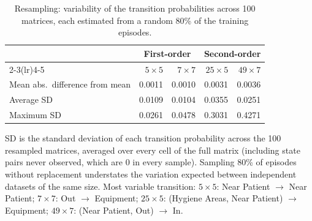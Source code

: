 \begin{table}[htbp]
\centering
\small
\caption{Resampling: variability of the transition probabilities across 100 matrices, each estimated from a random 80\% of the training episodes.}
\label{tab:bootstrap}
\setlength{\tabcolsep}{4pt}
\begin{tabular*}{\linewidth}{@{\extracolsep{\fill}}lrrrr}
\toprule
 & \multicolumn{2}{c}{\textbf{First-order}} & \multicolumn{2}{c}{\textbf{Second-order}} \\
\cmidrule(lr){2-3}\cmidrule(lr){4-5}
 & $5\times5$ & $7\times7$ & $25\times5$ & $49\times7$ \\
\midrule
Mean abs.\ difference from mean & 0.0011 & 0.0010 & 0.0031 & 0.0036 \\
Average SD & 0.0109 & 0.0104 & 0.0355 & 0.0251 \\
Maximum SD & 0.0261 & 0.0478 & 0.3031 & 0.4271 \\
\bottomrule
\end{tabular*}
\par\smallskip
\begin{minipage}{\linewidth}\footnotesize
SD is the standard deviation of each transition probability across the 100 resampled matrices, averaged over every cell of the full matrix (including state pairs never observed, which are 0 in every sample). Sampling 80\% of episodes without replacement understates the variation expected between independent datasets of the same size. Most variable transition: $5\times5$: Near Patient $\rightarrow$ Near Patient; $7\times7$: Out $\rightarrow$ Equipment; $25\times5$: (Hygiene Areas, Near Patient) $\rightarrow$ Equipment; $49\times7$: (Near Patient, Out) $\rightarrow$ In.
\end{minipage}
\end{table}
